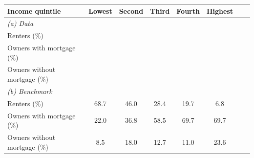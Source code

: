 \begin{table}[p]
\footnotesize
\renewcommand{\arraystretch}{1.2}
\begin{center}
\begin{tabular}{lccccccc}
\toprule
Income quintile & Lowest & Second & Third & Fourth & Highest\\ 
\midrule
\multicolumn{6}{l}{\textit{(a) Data}}\\
\quad Renters (\%) & \\
\quad Owners with mortgage (\%) & \\
\quad Owners without mortgage (\%) & \\
\multicolumn{6}{l}{\textit{(b) Benchmark}}\\
\quad Renters (\%) &  68.7 & 46.0 & 28.4 & 19.7 &  6.8 \\
\quad Owners with mortgage (\%) & 22.0 & 36.8 & 58.5 & 69.7 & 69.7 \\ 
\quad Owners without mortgage (\%) & 8.5 &  18.0 & 12.7 & 11.0 & 23.6 \\
\bottomrule
\end{tabular}
\end{center}
\normalsize
\end{table}
